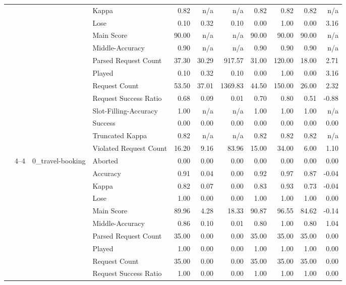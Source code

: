 \begin{tabular}{llllrrrrrrr}
 &  &  & Kappa & 0.82 & n/a & n/a & 0.82 & 0.82 & 0.82 & n/a \\
 &  &  & Lose & 0.10 & 0.32 & 0.10 & 0.00 & 1.00 & 0.00 & 3.16 \\
 &  &  & Main Score & 90.00 & n/a & n/a & 90.00 & 90.00 & 90.00 & n/a \\
 &  &  & Middle-Accuracy & 0.90 & n/a & n/a & 0.90 & 0.90 & 0.90 & n/a \\
 &  &  & Parsed Request Count & 37.30 & 30.29 & 917.57 & 31.00 & 120.00 & 18.00 & 2.71 \\
 &  &  & Played & 0.10 & 0.32 & 0.10 & 0.00 & 1.00 & 0.00 & 3.16 \\
 &  &  & Request Count & 53.50 & 37.01 & 1369.83 & 44.50 & 150.00 & 26.00 & 2.32 \\
 &  &  & Request Success Ratio & 0.68 & 0.09 & 0.01 & 0.70 & 0.80 & 0.51 & -0.88 \\
 &  &  & Slot-Filling-Accuracy & 1.00 & n/a & n/a & 1.00 & 1.00 & 1.00 & n/a \\
 &  &  & Success & 0.00 & 0.00 & 0.00 & 0.00 & 0.00 & 0.00 & 0.00 \\
 &  &  & Truncated Kappa & 0.82 & n/a & n/a & 0.82 & 0.82 & 0.82 & n/a \\
 &  &  & Violated Request Count & 16.20 & 9.16 & 83.96 & 15.00 & 34.00 & 6.00 & 1.10 \\
\cline{2-11} \cline{3-11}
 & \multirow[t]{70}{*}{4--4} & \multirow[t]{14}{*}{0_travel-booking} & Aborted & 0.00 & 0.00 & 0.00 & 0.00 & 0.00 & 0.00 & 0.00 \\
 &  &  & Accuracy & 0.91 & 0.04 & 0.00 & 0.92 & 0.97 & 0.87 & -0.04 \\
 &  &  & Kappa & 0.82 & 0.07 & 0.00 & 0.83 & 0.93 & 0.73 & -0.04 \\
 &  &  & Lose & 1.00 & 0.00 & 0.00 & 1.00 & 1.00 & 1.00 & 0.00 \\
 &  &  & Main Score & 89.96 & 4.28 & 18.33 & 90.87 & 96.55 & 84.62 & -0.14 \\
 &  &  & Middle-Accuracy & 0.86 & 0.10 & 0.01 & 0.80 & 1.00 & 0.80 & 1.04 \\
 &  &  & Parsed Request Count & 35.00 & 0.00 & 0.00 & 35.00 & 35.00 & 35.00 & 0.00 \\
 &  &  & Played & 1.00 & 0.00 & 0.00 & 1.00 & 1.00 & 1.00 & 0.00 \\
 &  &  & Request Count & 35.00 & 0.00 & 0.00 & 35.00 & 35.00 & 35.00 & 0.00 \\
 &  &  & Request Success Ratio & 1.00 & 0.00 & 0.00 & 1.00 & 1.00 & 1.00 & 0.00 \\

\end{tabular}
